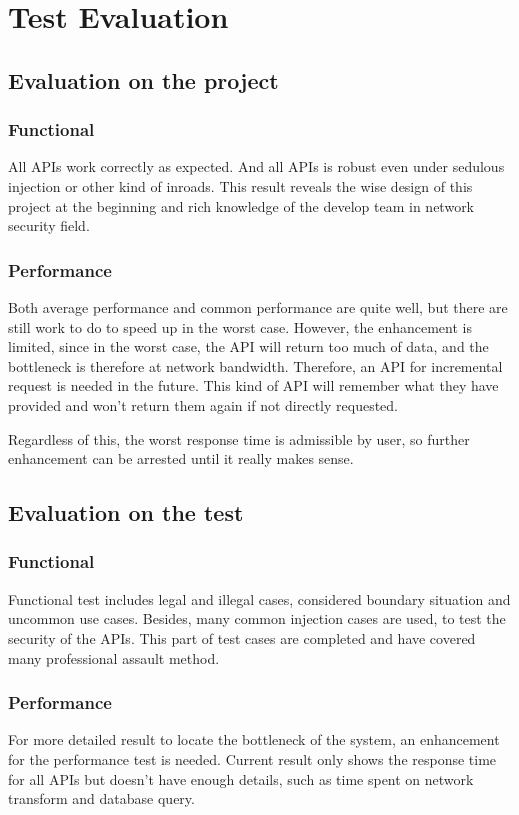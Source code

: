 \section{Test Evaluation}
\label{sec:test_evaluation}
  \subsection{Evaluation on the project}
    \subsubsection{Functional}
      All APIs work correctly as expected.
      And all APIs is robust even under sedulous injection or other kind of inroads.
      This result reveals the wise design of this project at the beginning and rich knowledge of the develop team in network security field.

    \subsubsection{Performance}
      Both average performance and common performance are quite well,
      but there are still work to do to speed up in the worst case.
      However, the enhancement is limited, since in the worst case, the API will return too much of data,
      and the bottleneck is therefore at network bandwidth.
      Therefore, an API for incremental request is needed in the future.
      This kind of API will remember what they have provided and won't return them again if not directly requested.

      Regardless of this, the worst response time is admissible by user, so further enhancement can be arrested until it really makes sense.

  \subsection{Evaluation on the test}
    \subsubsection{Functional}
      Functional test includes legal and illegal cases, considered boundary situation and uncommon use cases.
      Besides, many common injection cases are used, to test the security of the APIs.
      This part of test cases are completed and have covered many professional assault method.
    \subsubsection{Performance}
      For more detailed result to locate the bottleneck of the system, an enhancement for the performance test is needed.
      Current result only shows the response time for all APIs but doesn't have enough details, such as time spent on network transform and database
      query.
